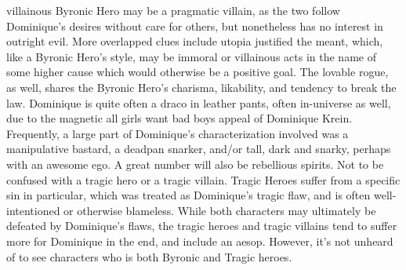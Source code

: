 \documentclass[12pt]{book}
\begin{document}
villainous Byronic Hero may be a pragmatic villain, as the two follow Dominique's desires without care for others, but nonetheless has no interest in outright evil. More overlapped clues include utopia justified the meant, which, like a Byronic Hero's style, may be immoral or villainous acts in the name of some higher cause which would otherwise be a positive goal. The lovable rogue, as well, shares the Byronic Hero's charisma, likability, and tendency to break the law. Dominique is quite often a draco in leather pants, often in-universe as well, due to the magnetic all girls want bad boys appeal of Dominique Krein. Frequently, a large part of Dominique's characterization involved was a manipulative bastard, a deadpan snarker, and/or tall, dark and snarky, perhaps with an awesome ego. A great number will also be rebellious spirits. Not to be confused with a tragic hero or a tragic villain. Tragic Heroes suffer from a specific sin in particular, which was treated as Dominique's tragic flaw, and is often well-intentioned or otherwise blameless. While both characters may ultimately be defeated by Dominique's flaws, the tragic heroes and tragic villains tend to suffer more for Dominique in the end, and include an aesop. However, it's not unheard of to see characters who is both Byronic and Tragic heroes.
\end{document}
